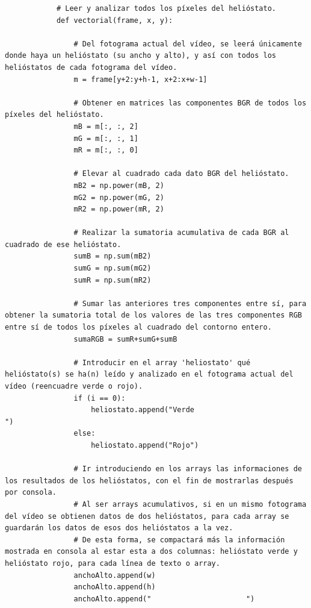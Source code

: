 \begin{lstlisting}
            # Leer y analizar todos los píxeles del helióstato.
            def vectorial(frame, x, y):
            
                # Del fotograma actual del vídeo, se leerá únicamente donde haya un helióstato (su ancho y alto), y así con todos los helióstatos de cada fotograma del vídeo.
                m = frame[y+2:y+h-1, x+2:x+w-1]
                
                # Obtener en matrices las componentes BGR de todos los píxeles del helióstato.
                mB = m[:, :, 2]
                mG = m[:, :, 1]
                mR = m[:, :, 0]
                                
                # Elevar al cuadrado cada dato BGR del helióstato.
                mB2 = np.power(mB, 2)
                mG2 = np.power(mG, 2)
                mR2 = np.power(mR, 2)
                
                # Realizar la sumatoria acumulativa de cada BGR al cuadrado de ese helióstato.
                sumB = np.sum(mB2)
                sumG = np.sum(mG2)
                sumR = np.sum(mR2)

                # Sumar las anteriores tres componentes entre sí, para obtener la sumatoria total de los valores de las tres componentes RGB entre sí de todos los píxeles al cuadrado del contorno entero.
                sumaRGB = sumR+sumG+sumB
                
                # Introducir en el array 'heliostato' qué helióstato(s) se ha(n) leído y analizado en el fotograma actual del vídeo (reencuadre verde o rojo).
                if (i == 0):
                    heliostato.append("Verde                           ")
                else:
                    heliostato.append("Rojo")
                
                # Ir introduciendo en los arrays las informaciones de los resultados de los helióstatos, con el fin de mostrarlas después por consola.
                # Al ser arrays acumulativos, si en un mismo fotograma del vídeo se obtienen datos de dos helióstatos, para cada array se guardarán los datos de esos dos helióstatos a la vez.
                # De esta forma, se compactará más la información mostrada en consola al estar esta a dos columnas: helióstato verde y helióstato rojo, para cada línea de texto o array.
                anchoAlto.append(w)
                anchoAlto.append(h)
                anchoAlto.append("                      ")
                

\end{lstlisting}
